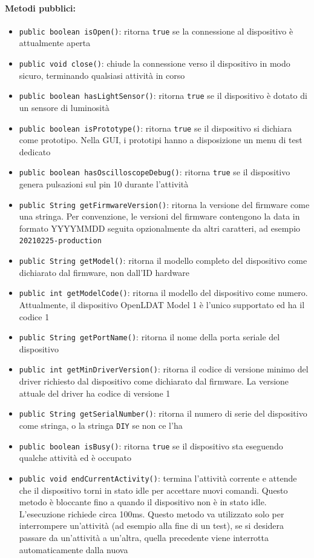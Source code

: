 \paragraph{Metodi pubblici:}\begin{itemize}
	\item \texttt{public boolean isOpen()}: ritorna \texttt{true} se la connessione al dispositivo è attualmente aperta
	\item \texttt{public void close()}: chiude la connessione verso il dispositivo in modo sicuro, terminando qualsiasi attività in corso
	\item \texttt{public boolean hasLightSensor()}: ritorna \texttt{true} se il dispositivo è dotato di un sensore di luminosità
	\item \texttt{public boolean isPrototype()}: ritorna \texttt{true} se il dispositivo si dichiara come prototipo. Nella GUI, i prototipi hanno a disposizione un menu di test dedicato
	\item \texttt{public boolean hasOscilloscopeDebug()}: ritorna \texttt{true} se il dispositivo genera pulsazioni sul pin 10 durante l'attività
	\item \texttt{public String getFirmwareVersion()}: ritorna la versione del firmware come una stringa. Per convenzione, le versioni del firmware contengono la data in formato YYYYMMDD seguita opzionalmente da altri caratteri, ad esempio \texttt{20210225-production}
	\item \texttt{public String getModel()}: ritorna il modello completo del dispositivo come dichiarato dal firmware, non dall'ID hardware
	\item \texttt{public int getModelCode()}: ritorna il modello del dispositivo come numero. Attualmente, il dispositivo OpenLDAT Model 1 è l'unico supportato ed ha il codice 1
	\item \texttt{public String getPortName()}: ritorna il nome della porta seriale del dispositivo
	\item \texttt{public int getMinDriverVersion()}: ritorna il codice di versione minimo del driver richiesto dal dispositivo come dichiarato dal firmware. La versione attuale del driver ha codice di versione 1
	\item \texttt{public String getSerialNumber()}: ritorna il numero di serie del dispositivo come stringa, o la stringa \texttt{DIY} se non ce l'ha
	\item \texttt{public boolean isBusy()}: ritorna \texttt{true} se il dispositivo sta eseguendo qualche attività ed è occupato
	\item \texttt{public void endCurrentActivity()}: termina l'attività corrente e attende che il dispositivo torni in stato idle per accettare nuovi comandi. Questo metodo è bloccante fino a quando il dispositivo non è in stato idle. L'esecuzione richiede circa 100ms. Questo metodo va utilizzato solo per interrompere un'attività (ad esempio alla fine di un test), se si desidera passare da un'attività a un'altra, quella precedente viene interrotta automaticamente dalla nuova

\end{itemize}
